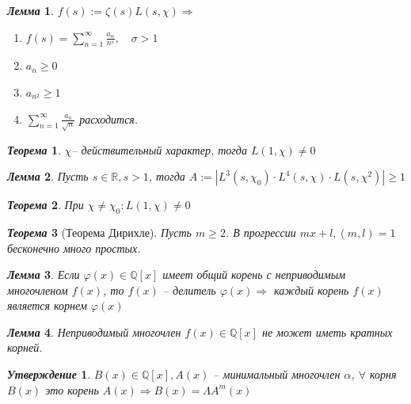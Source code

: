 \documentclass[a4paper,12pt]{article}
\newtheorem{teo2}{\textit{Теорема}}
\newtheorem{utv2}{\textit{Утверждение}}
\newtheorem{lem2}{\textit{Лемма}}
\newcommand{\FI}{\varphi}
\newcommand{\AL}{\alpha}
\newcommand{\q}{\quad}
\newcommand{\Ra}{\Rightarrow}
\newcommand{\bb}[1]{\mathbb{#1}}
\newcommand{\SL}{\sum\limits}
\begin{document}
\begin{formbox}{}
\begin{lem2} $f(s):= \zeta(s) L(s,\chi) \Ra$
\begin{enumerate}
\item $f(s) = \SL_{n=1}^\infty \frac{a_n}{n^s},\q\sigma > 1 $
\item $a_n \ge 0$
\item $a_{n^2} \ge 1$
\item $\SL_{n=1}^\infty \frac{a_n}{\sqrt{n}} $ расходится.
\end{enumerate}
\end{lem2}
\end{formbox}
\begin{formbox}{}
\begin{teo2} $\chi$-- действительный характер, тогда $L(1, \chi) \not=0$
\end{teo2}
\end{formbox}
\begin{formbox}{}
\begin{lem2} Пусть $s\in \bb{R}, s > 1$, тогда $A:= |L^3(s,\chi_0)\cdot L^4(s,\chi)\cdot L(s, \chi^2)| \ge 1$
\end{lem2}
\end{formbox}
\begin{formbox}{}
\begin{teo2} При $\chi \not= \chi_0: L(1,\chi)\not=0$
\end{teo2}
\end{formbox}
\begin{formbox}{}
\begin{teo2}[Теорема Дирихле] Пусть $m\ge 2$. В прогрессии $mx+l, (m,l) = 1$ бесконечно много простых.
\end{teo2}
\end{formbox}
\begin{formbox}{}
\begin{lem2} Если $\FI(x)\in\bb{Q}[x]   $ имеет общий корень с неприводимым многочленом $f(x)$, то $f(x)$ -- делитель $\FI(x)\Ra $ каждый корень $f(x)$ является корнем $\FI(x)$
\end{lem2}
\end{formbox}
\begin{formbox}{}
\begin{lem2} Неприводимый многочлен $f(x)\in\bb{Q}[x]$ не может иметь кратных корней.
\end{lem2}
\end{formbox}
\begin{formbox}{}
\begin{utv2} $B(x) \in \bb{Q}[x], A(x) $ -- минимальный многочлен $\AL$, $\forall$ корня $B(x)$ это корень $A(x)\Ra B(x) = \Lambda  A^m(x)$
\end{utv2}
\end{formbox}
\end{document}
